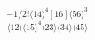 \documentclass[varwidth, border=5pt]{standalone}
\begin{document}
\begin{my}
$\begin{gathered}
\scriptscriptstyle\frac{-1/2i\langle14\rangle^4[16]\langle56\rangle^3}{\langle12\rangle\langle15\rangle^4\langle23\rangle\langle34\rangle\langle45\rangle}
\end{gathered}$
\end{my}
\end{document}
